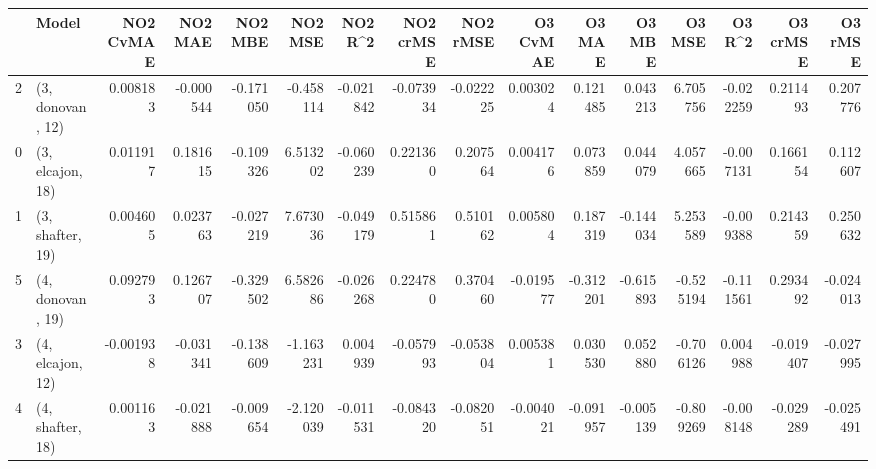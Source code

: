 \begin{tabular}{llrrrrrrrrrrrrrr}
\toprule
{} &             Model &  NO2 CvMAE &   NO2 MAE &   NO2 MBE &   NO2 MSE &   NO2 R\textasciicircum2 &  NO2 crMSE &  NO2 rMSE &  O3 CvMAE &    O3 MAE &    O3 MBE &    O3 MSE &    O3 R\textasciicircum2 &  O3 crMSE &   O3 rMSE \\
\midrule
2 &  (3, donovan, 12) &   0.008183 & -0.000544 & -0.171050 & -0.458114 & -0.021842 &  -0.073934 & -0.022225 &  0.003024 &  0.121485 &  0.043213 &  6.705756 & -0.022259 &  0.211493 &  0.207776 \\
0 &  (3, elcajon, 18) &   0.011917 &  0.181615 & -0.109326 &  6.513202 & -0.060239 &   0.221360 &  0.207564 &  0.004176 &  0.073859 &  0.044079 &  4.057665 & -0.007131 &  0.166154 &  0.112607 \\
1 &  (3, shafter, 19) &   0.004605 &  0.023763 & -0.027219 &  7.673036 & -0.049179 &   0.515861 &  0.510162 &  0.005804 &  0.187319 & -0.144034 &  5.253589 & -0.009388 &  0.214359 &  0.250632 \\
5 &  (4, donovan, 19) &   0.092793 &  0.126707 & -0.329502 &  6.582686 & -0.026268 &   0.224780 &  0.370460 & -0.019577 & -0.312201 & -0.615893 & -0.525194 & -0.111561 &  0.293492 & -0.024013 \\
3 &  (4, elcajon, 12) &  -0.001938 & -0.031341 & -0.138609 & -1.163231 &  0.004939 &  -0.057993 & -0.053804 &  0.005381 &  0.030530 &  0.052880 & -0.706126 &  0.004988 & -0.019407 & -0.027995 \\
4 &  (4, shafter, 18) &   0.001163 & -0.021888 & -0.009654 & -2.120039 & -0.011531 &  -0.084320 & -0.082051 & -0.004021 & -0.091957 & -0.005139 & -0.809269 & -0.008148 & -0.029289 & -0.025491 \\
\bottomrule
\end{tabular}

